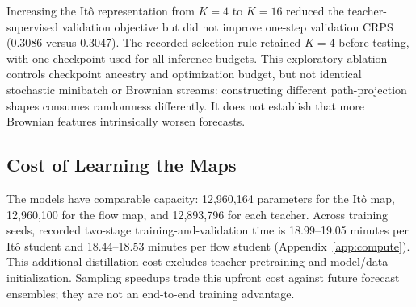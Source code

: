 Increasing the It\^o representation from $K=4$ to $K=16$ reduced the teacher-supervised validation objective but did not improve one-step validation CRPS (0.3086 versus 0.3047). The recorded selection rule retained $K=4$ before testing, with one checkpoint used for all inference budgets. This exploratory ablation controls checkpoint ancestry and optimization budget, but not identical stochastic minibatch or Brownian streams: constructing different path-projection shapes consumes randomness differently. It does not establish that more Brownian features intrinsically worsen forecasts.

\subsection{Cost of Learning the Maps}
The models have comparable capacity: 12,960,164 parameters for the It\^o map, 12,960,100 for the flow map, and 12,893,796 for each teacher. Across training seeds, recorded two-stage training-and-validation time is 18.99--19.05 minutes per It\^o student and 18.44--18.53 minutes per flow student (Appendix~\ref{app:compute}). This additional distillation cost excludes teacher pretraining and model/data initialization. Sampling speedups trade this upfront cost against future forecast ensembles; they are not an end-to-end training advantage.
